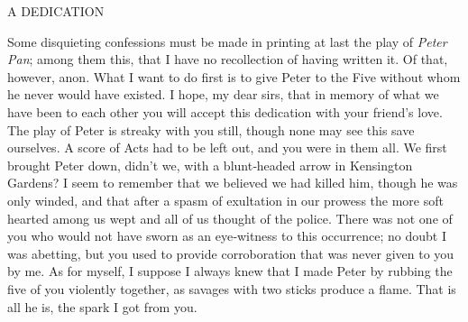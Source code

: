 
\centerline{}\afterchapternum
{\centering \chaptitlefont\MakeTextUppercase{A Dedication}\afterchaptertitle}

Some disquieting confessions must be made in printing at last the play of \emph{Peter Pan};
among them this, that I have no recollection of having written it.
Of that, however, anon.
What I want to do first is to give Peter to the Five without whom he never would have existed.
I hope, my dear sirs,
that in memory of what we have been to each other
you will accept this dedication with your friend’s love.
The play of Peter is streaky with you still,
though none may see this save ourselves.
A score of Acts had to be left out, and you were in them all.
We first brought Peter down, didn’t we, with a blunt‐headed arrow in Kensington Gardens?
I seem to remember that we believed we had killed him,
though he was only winded,
and that after a spasm of exultation in our prowess
the more soft hearted among us wept and all of us thought of the police.
There was not one of you who would not have sworn as an eye‐witness to this occurrence;
no doubt I was abetting,
but you used to provide corroboration that was never given to you by me.
As for myself,
I suppose I always knew that I made Peter by rubbing the five of you violently together,
as savages with two sticks produce a flame.
That is all he is, the spark I got from you.

